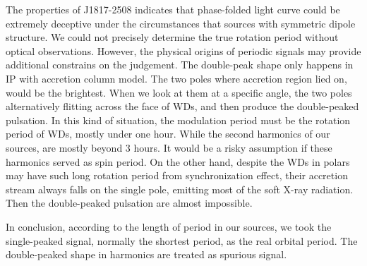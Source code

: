 \documentclass[twoside,twocolumn]{aastex63}
\begin{document}
 The properties of J1817-2508 indicates that phase-folded light curve could be extremely deceptive under the circumstances that sources with symmetric dipole structure. We could not precisely determine the true rotation period without optical observations. However, the physical origins of periodic signals may provide additional constrains on the judgement. The double-peak shape only happens in IP with accretion column model. The two poles where accretion region lied on, would be the brightest. When we look at them at a specific angle, the two poles alternatively flitting across the face of WDs, and then produce the double-peaked pulsation. In this kind of situation, the modulation period must be the rotation period of WDs, mostly under one hour. While the second harmonics of our sources, are mostly beyond 3 hours. It would be a risky assumption if these harmonics served as spin period. On the other hand, despite the WDs in polars may have such long rotation period from synchronization effect, their accretion stream always falls on the single pole, emitting most of the soft X-ray radiation. Then the double-peaked pulsation are almost impossible. 
 
 In conclusion, according to the length of period in our sources, we took the single-peaked signal, normally the shortest period, as the real orbital period. The double-peaked shape in harmonics are treated as spurious signal. 
\end{document}
